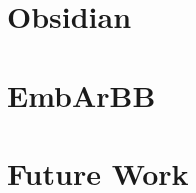 \documentclass[xcolor=dvipsnames]{beamer}
\begin{document}
%
\section{Obsidian}

%
\section{EmbArBB} 

%
\section{Future Work}
\end{document}
